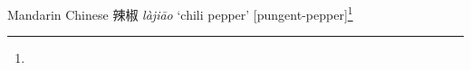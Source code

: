 \begin{etymology}\label{ety:lajiao}
Mandarin Chinese {辣椒} \textit{làjiāo} `chili pepper' [pungent-pepper]\footnote{}
\end{etymology}